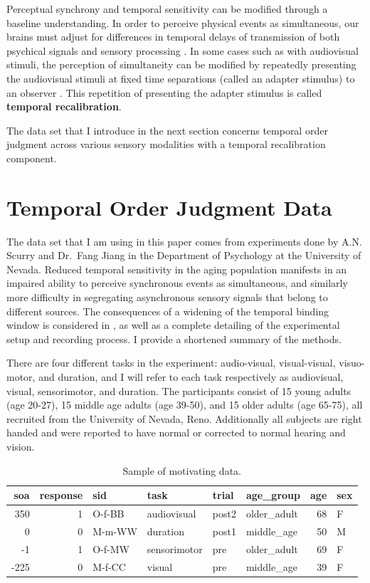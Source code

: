 \documentclass[
]{report}
\begin{document}
Perceptual synchrony and temporal sensitivity can be modified through a baseline understanding. In order to perceive physical events as simultaneous, our brains must adjust for differences in temporal delays of transmission of both psychical signals and sensory processing \citep{fujisaki2004recalibration}. In some cases such as with audiovisual stimuli, the perception of simultaneity can be modified by repeatedly presenting the audiovisual stimuli at fixed time separations (called an adapter stimulus) to an observer \citep{vroomen2004recalibration}. This repetition of presenting the adapter stimulus is called \textbf{temporal recalibration}.

The data set that I introduce in the next section concerns temporal order judgment across various sensory modalities with a temporal recalibration component.

\hypertarget{temporal-order-judgment-data}{%
\section{Temporal Order Judgment Data}\label{temporal-order-judgment-data}}

The data set that I am using in this paper comes from experiments done by A.N. Scurry and Dr.~Fang Jiang in the Department of Psychology at the University of Nevada. Reduced temporal sensitivity in the aging population manifests in an impaired ability to perceive synchronous events as simultaneous, and similarly more difficulty in segregating asynchronous sensory signals that belong to different sources. The consequences of a widening of the temporal binding window is considered in \citet{scurry2019aging}, as well as a complete detailing of the experimental setup and recording process. I provide a shortened summary of the methods.

There are four different tasks in the experiment: audio-visual, visual-visual, visuo-motor, and duration, and I will refer to each task respectively as audiovisual, visual, sensorimotor, and duration. The participants consist of 15 young adults (age 20-27), 15 middle age adults (age 39-50), and 15 older adults (age 65-75), all recruited from the University of Nevada, Reno. Additionally all subjects are right handed and were reported to have normal or corrected to normal hearing and vision.

\begin{table}[!h]

\caption{\label{tab:multitask-data}Sample of motivating data.}
\centering
\begin{tabular}[t]{rrllllrl}
\toprule
soa & response & sid & task & trial & age\_group & age & sex\\
\midrule
350 & 1 & O-f-BB & audiovisual & post2 & older\_adult & 68 & F\\
0 & 0 & M-m-WW & duration & post1 & middle\_age & 50 & M\\
-1 & 1 & O-f-MW & sensorimotor & pre & older\_adult & 69 & F\\
-225 & 0 & M-f-CC & visual & pre & middle\_age & 39 & F\\
\bottomrule
\end{tabular}
\end{table}
\end{document}
